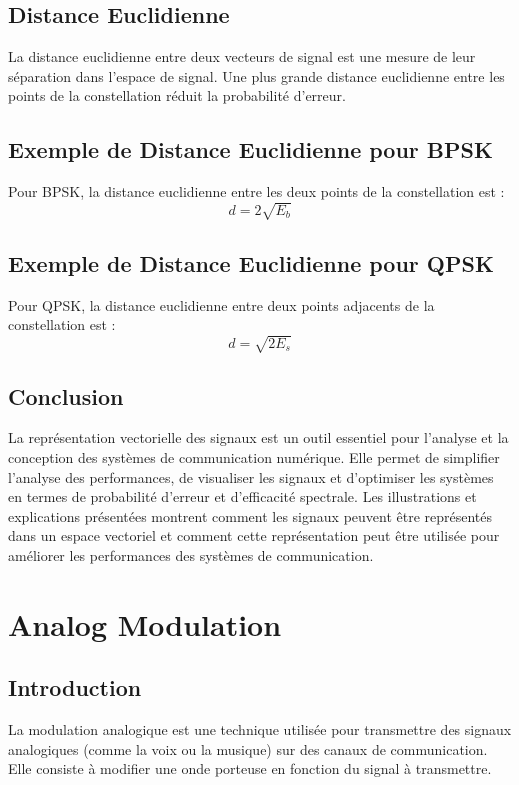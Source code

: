 \documentclass[10pt,a4paper]{article}
\begin{document}
\subsection*{Distance Euclidienne}
La distance euclidienne entre deux vecteurs de signal est une mesure de leur séparation dans l'espace de signal. Une plus grande distance euclidienne entre les points de la constellation réduit la probabilité d'erreur.

\subsection*{Exemple de Distance Euclidienne pour BPSK}
Pour BPSK, la distance euclidienne entre les deux points de la constellation est :
\[
d = 2\sqrt{E_b}
\]

\subsection*{Exemple de Distance Euclidienne pour QPSK}
Pour QPSK, la distance euclidienne entre deux points adjacents de la constellation est :
\[
d = \sqrt{2E_s}
\]

\subsection*{Conclusion}
La représentation vectorielle des signaux est un outil essentiel pour l'analyse et la conception des systèmes de communication numérique. Elle permet de simplifier l'analyse des performances, de visualiser les signaux et d'optimiser les systèmes en termes de probabilité d'erreur et d'efficacité spectrale. Les illustrations et explications présentées montrent comment les signaux peuvent être représentés dans un espace vectoriel et comment cette représentation peut être utilisée pour améliorer les performances des systèmes de communication.

\section*{Analog Modulation}

\subsection*{Introduction}
La modulation analogique est une technique utilisée pour transmettre des signaux analogiques (comme la voix ou la musique) sur des canaux de communication. Elle consiste à modifier une onde porteuse en fonction du signal à transmettre.
\end{document}
